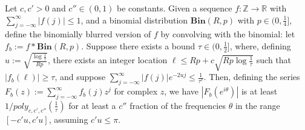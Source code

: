 \documentclass[11pt]{article}
\theoremstyle{plain}
\newcommand{\Bin}[2]{\textbf{Bin}(#1,#2)}
\begin{document}
\begin{lemma}\label{lem:mostly-big-laurent}
Let $c,c'>0$ and $c''\in(0,1)$ be constants. Given a sequence $f:\mathbb{Z} \rightarrow\mathbb{R}$ with $\sum_{j=-\infty}^{\infty} |f(j)|\leq 1$, and a binomial distribution $\Bin{R}{p}$ with $p\in (0,\frac{1}{4}]$, define the binomially blurred version of $f$ by convolving with the binomial: let $f_b:=f\ast \Bin{R}{p}$. Suppose there exists a bound $\tau\in(0,\frac{1}{2}]$, where, defining $u:=\sqrt{\frac{\log\frac{1}{\tau}}{R p}}$,  there exists an integer location $\ell\leq Rp+c\sqrt{Rp\log\frac{1}{\tau}}$ such that $|f_b(\ell)|\geq\tau$, and suppose $\sum_{j=-\infty}^{\infty} |f(j)|e^{-2uj}\leq \frac{1}{\tau^c}$. Then, defining the series $F_b(z):=\sum_{j=-\infty}^{\infty} f_b(j)z^j$ for complex $z$, we have $|F_b(e^{i\theta})|$ is at least $1/poly_{c,c',c''}(\frac{1}{\tau})$ for at least a $c''$ fraction of the frequencies $\theta$ in the range $[-c'u,c'u]$, assuming $c'u\leq \pi$.
\end{lemma}
\end{document}
